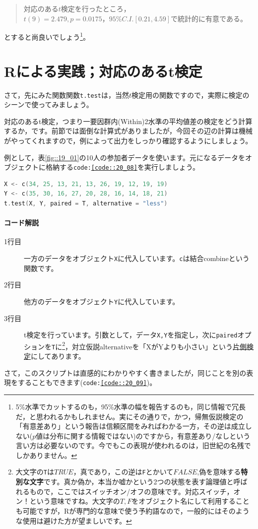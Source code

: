 \documentclass{ltjsbook}
\begin{document}
\begin{quote}
    対応のある$t$検定を行ったところ，$t(9)=2.479,p=0.0175，95\%C.I.[0.21,4.59]$で統計的に有意である。
\end{quote}
とすると尚良いでしょう\footnote{5\%水準でカットするのも，95\%水準の幅を報告するのも，同じ情報で冗長だ，と思われるかもしれません。実にその通りで，かつ，帰無仮説検定の「有意差あり」という報告は信頼区間をみればわかる一方，その逆は成立しない($p$値は分布に関する情報ではない)のですから，有意差あり/なしという言い方は必要ないのです。今でもこの表現が使われるのは，旧世紀の名残でしかありません。}。

\section{Rによる実践；対応のあるt検定}
さて，先にみた関数関数\texttt{t.test}は，当然$t$検定用の関数ですので，実際に検定のシーンで使ってみましょう。

対応のあるt検定，つまり一要因群内(Within)2水準の平均値差の検定をどう計算するか，です。前節では面倒な計算式がありましたが，今回その辺の計算は機械がやってくれますので，例によって出力をしっかり確認するようにしましょう。

例として，表\ref{fig::19_01}の10人の参加者データを使います。元になるデータをオブジェクトに格納する\texttt{code:\ref{code::20_08}}を実行しましょう。
\begin{lstlisting}[language=c++,label={code::20_08},caption={t検定を行う}]
X <- c(34, 25, 13, 21, 13, 26, 19, 12, 19, 19)
Y <- c(35, 30, 16, 27, 20, 28, 16, 14, 18, 21)
t.test(X, Y, paired = T, alternative = "less")
\end{lstlisting}

\paragraph{コード解説}
\begin{description}
    \item[1行目] 一方のデータをオブジェクト\texttt{X}に代入しています。\texttt{c}は結合combineという関数です。
    \item[2行目] 他方のデータをオブジェクト\texttt{Y}に代入しています。
    \item[3行目] t検定を行っています。引数として，データ\texttt{X,Y}を指定し，次に\texttt{paired}オプションを\texttt{T}に\footnote{大文字の\texttt{T}は$TRUE$，真であり，この逆は\texttt{F}とかいて$FALSE$,偽を意味する\textbf{特別な文字}です。真か偽か，本当か嘘かという2つの状態を表す論理値と呼ばれるもので，ここではスイッチオン/オフの意味です。対応スイッチ，オン！という意味ですね。大文字の$T,F$をオブジェクト名にして利用することも可能ですが，Rが専門的な意味で使う予約語なので，一般的にはそのような使用は避けた方が望ましいです。}，対立仮説alternativeを「XがYよりも小さい」という\underline{片側検定}にしてあります。
\end{description}
さて，このスクリプトは直感的にわかりやすく書きましたが，同じことを別の表現をすることもできます(\texttt{code:\ref{code::20_09}})。
\end{document}
